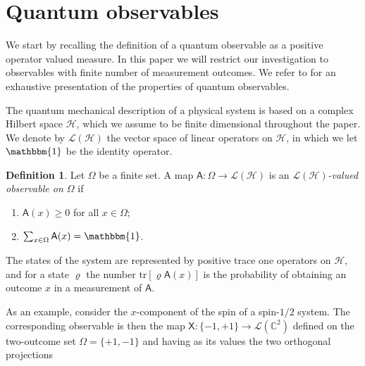 \documentclass[12pt]{amsart}
\theoremstyle{definition}
\newtheorem{definition}{Definition}
\newcommand{\complex}{\mathbb C} %
\newcommand{\hi}{\mathcal{H}} %
\newcommand{\hh}{\mathcal{H}} %
\newcommand{\lh}{\mathcal{L(H)}} %
\newcommand{\elle}[1]{\mathcal{L}(#1)} %
\newcommand{\tr}[1]{\mathrm{tr}\left[#1\right]} %
\newcommand{\id}{\mathbbm{1}} %
\newcommand{\A}{\mathsf{A}}%
\begin{document}
\section{Quantum observables}
\label{sec:observables}

We start by recalling the definition of a quantum observable as a positive operator valued measure. 
In this paper we will restrict our investigation to observables with finite number of measurement outcomes. 
We refer to \cite{OQP97} for an exhaustive presentation of the properties of quantum observables.

The quantum mechanical description of a physical system is based on a complex Hilbert space $\hi$, which we assume to be finite dimensional throughout the paper. 
We denote by $\lh$ the vector space of linear operators on $\hi$, in which we let $\id$ be the identity operator. 



\begin{definition}\label{def:obs}
Let $\Omega$ be a finite set. A map $\A:\Omega \to \lh$ is an \emph{$\lh$-valued observable on $\Omega$} if
\begin{enumerate}[leftmargin=*,labelsep=3mm,label=(\roman*)]
\item $\A(x) \geq 0$ for all $x\in\Omega$;
\item $\sum_{x\in\Omega} \A(x) = \id$.
\end{enumerate}
\end{definition}
The states of the system are represented by positive trace one operators on $\hh$, and for a  state $\varrho$ the number $\tr{\varrho\A(x)}$ is the probability of obtaining an outcome $x$ in a measurement of $\A$. 

As an example, consider the $x$-component of the spin of a spin-$1/2$ system. The corresponding observable is then the map $\mathsf{X}:\{-1,+1\}\to\mathcal{L}(\complex^2)$ defined on the two-outcome set $\Omega=\{+1,-1\}$ and having as its values the two orthogonal projections
\end{document}
